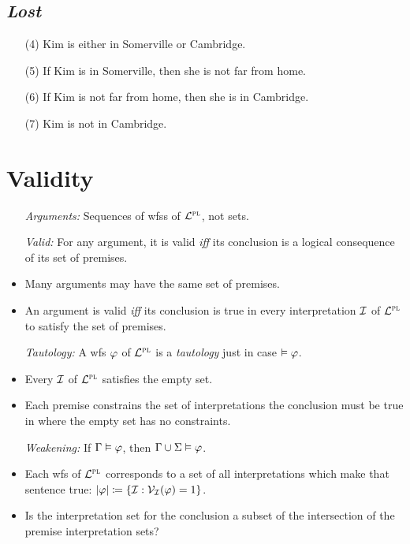 \documentclass[a4paper, 11pt]{article} %
\begin{document}
\subsection*{\it \textbf{Lost}}

\begin{enumerate}
  \item[(4)] Kim is either in Somerville or Cambridge.
  \item[(5)] If Kim is in Somerville, then she is not far from home.
  \item[(6)] If Kim is not far from home, then she is in Cambridge.
  \item[(7)] Kim is not in Cambridge.
\end{enumerate}






\section*{Validity}

\begin{itemize}[leftmargin=1in,labelsep=.15in] %
  \item[\it Arguments:] Sequences of wfss of $\mathcal{L}^{\textsc{pl}}$, not sets. 
  \item[\it Valid:] For any argument, it is valid \textit{iff} its conclusion is a logical consequence of its set of premises.
    \item Many arguments may have the same set of premises.
    \item An argument is valid \textit{iff} its conclusion is true in every interpretation $\mathcal{I}$ of $\mathcal{L}^{\textsc{pl}}$ to satisfy the set of premises. 
  \item[\it Tautology:] A wfs $\varphi$ of $\mathcal{L}^{\textsc{pl}}$ is a \textit{tautology} just in case $\vDash \varphi$.
    \item Every $\mathcal{I}$ of $\mathcal{L}^{\textsc{pl}}$ satisfies the empty set.
    \item Each premise constrains the set of interpretations the conclusion must be true in where the empty set has no constraints.
  \item[\it Weakening:] If $\Gamma \vDash \varphi$, then $\Gamma \cup \Sigma \vDash \varphi$.
    \item Each wfs of $\mathcal{L}^{\textsc{pl}}$ corresponds to a set of all interpretations which make that sentence true: $\lvert\varphi\rvert \coloneq \lbrace\mathcal{I} : \mathcal{V}_{\mathcal{I}}(\varphi) = 1\rbrace$.
    \item Is the interpretation set for the conclusion a subset of the intersection of the premise interpretation sets?
\end{itemize}
\end{document}

